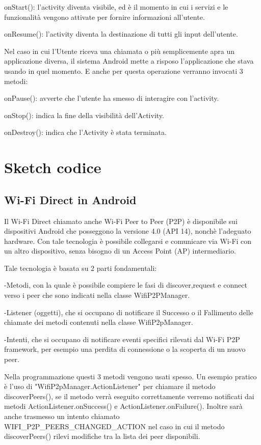 onStart(): l'activity diventa visibile, ed è il momento in cui i servizi e le funzionalità vengono attivate per fornire informazioni all'utente.

onResume(): l'activity diventa la destinazione di tutti gli input dell'utente.

Nel caso in cui l'Utente riceva una chiamata o più semplicemente apra un applicazione diversa, il sistema Android mette a risposo l'applicazione che stava usando in quel momento.
E anche per questa operazione verranno invocati 3 metodi:

onPause(): avverte che l'utente ha smesso di interagire con l'activity.

onStop(): indica la fine della visibilità dell'Activity.

onDestroy(): indica che l'Activity è stata terminata.

\section{Sketch codice}

\subsection{Wi-Fi Direct in Android}

Il Wi-Fi Direct chiamato anche Wi-Fi Peer to Peer (P2P) è disponibile sui dispositivi Android che posseggono la versione 4.0 (API 14), nonchè l'adeguato hardware.
Con tale tecnologia è possibile collegarsi e comunicare via Wi-Fi con un altro dispositivo, senza bisogno di un Access Point (AP) intermediario.

Tale tecnologia è basata su 2 parti fondamentali:

-Metodi, con la quale è possibile compiere le fasi di discover,request e connect verso i peer che sono indicati nella classe WifiP2PManager.

-Listener (oggetti), che si occupano di notificare il Successo o il Fallimento delle chiamate dei metodi contenuti nella classe WifiP2pManager.

-Intenti, che si occupano di notificare eventi specifici rilevati dal Wi-Fi P2P framework, per esempio una perdita di connessione o la scoperta di un nuovo peer.

Nella programmazione questi 3 metodi vengono usati spesso.
Un esempio pratico è l'uso di "WifiP2pManager.ActionListener" per chiamare il metodo discoverPeers(), se il metodo verrà eseguito correttamente verremo notificati dai metodi ActionListener.onSuccess() e ActionListener.onFailure().
Inoltre sarà anche trasmesso un intento chiamato WIFI_P2P_PEERS_CHANGED_ACTION nel caso in cui il metodo discoverPeers() rilevi modifiche tra la lista dei peer disponibili.


